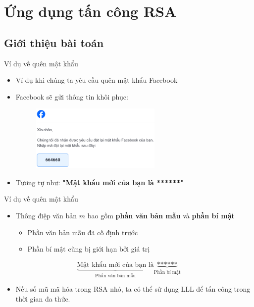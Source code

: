\section{Ứng dụng tấn công RSA}

\subsection{Giới thiệu bài toán}

\begin{frame}{Ví dụ về quên mật khẩu}

\begin{itemize}
\item Ví dụ khi chúng ta yêu cầu quên mật khẩu Facebook
\item Facebook sẽ gửi thông tin khôi phục:

\begin{figure}[h]
\includegraphics[width=0.6\textwidth]{pictures/facebook.png}
\end{figure}

\item Tương tự như: \textbf{"Mật khẩu mới của bạn là ******"}
\end{itemize}

\end{frame}
\begin{frame}{Ví dụ về quên mật khẩu}

\begin{itemize}
\item Thông điệp văn bản \(m \) bao gồm \textbf{phần văn bản mẫu} và \textbf{phần bí mật}


\begin{itemize}
\item  Phần văn bản mẫu   đã cố định trước
\item   Phần bí mật  cũng bị giới hạn bởi giá trị  
\end{itemize}

\end{itemize}

$$
\underbrace{\text{Mật khẩu mới của bạn là}}_{\text{Phần văn bản mẫu}}
\underbrace{\text{******}}_{\text{Phần bí mật}}
$$

\begin{itemize}
\item Nếu số mũ mã hóa trong RSA nhỏ, ta có thể sử dụng LLL để tấn công trong thời gian đa thức.
\end{itemize}

\end{frame}
